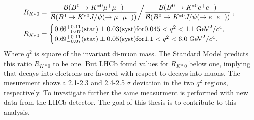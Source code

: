 \documentclass[english]{uzhpub}
\begin{document}
\begin{equation}
  \begin{split}
  R_{K*0} &= \left. \dfrac{\mathcal{B}(B^0 \rightarrow K^{*0} \mu^+ \mu^-)}{\mathcal{B}(B^0 \rightarrow K^{*0} J/\psi(\rightarrow \mu^+ \mu^-))} \middle/   \dfrac{\mathcal{B}(B^0 \rightarrow K^{*0} e^+ e^-)}{\mathcal{B} ( B^0 \rightarrow K^{*0} J/\psi(\rightarrow e^+ e^-))}  \right. , \\
  R_{K*0} &=   \begin{cases}
    0.66^{+0.11}_{-0.07} (\text{stat}) \pm 0.03 (\text{syst}) \text{for} 0.045 < q^2 < 1.1 \text{ GeV}^2/c^4, \\
    0.69^{+0.11}_{-0.07} (\text{stat}) \pm 0.05 (\text{syst}) \text{for} 1.1 < q^2 < 6.0 \text{ GeV}^2/c^4.
\end{cases}
\end{split}
\end{equation}
Where $q^2$ is square of the invariant di-muon mass.
The Standard Model predicts this ratio $R_{K*0}$ to be one. But LHCb found values for $R_{K*0}$ below one, implying that decays into electrons are favored with respect to decays into muons.
The mesurement shows a 2.1-2.3 and 2.4-2.5 $\sigma$ deviation in the two $q^2$ regions, respectively.
To investigate further the same measurment is performed with new data from the LHCb detector. The goal of this thesis is to contribute to this analysis.
\end{document}
